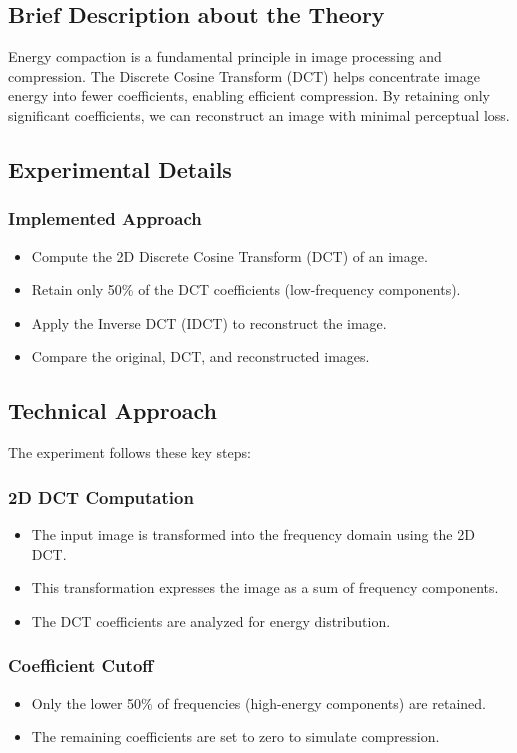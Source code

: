 \documentclass[12pt,a4paper]{article}
\begin{document}
\subsection{Brief Description about the Theory}
Energy compaction is a fundamental principle in image processing and compression. The Discrete Cosine Transform (DCT) helps concentrate image energy into fewer coefficients, enabling efficient compression. By retaining only significant coefficients, we can reconstruct an image with minimal perceptual loss.

\subsection{Experimental Details}
\subsubsection{Implemented Approach}
\begin{itemize}
  \item Compute the 2D Discrete Cosine Transform (DCT) of an image.
  \item Retain only 50\% of the DCT coefficients (low-frequency components).
  \item Apply the Inverse DCT (IDCT) to reconstruct the image.
  \item Compare the original, DCT, and reconstructed images.
\end{itemize}

\subsection{Technical Approach}
The experiment follows these key steps:

\subsubsection{2D DCT Computation}
\begin{itemize}
  \item The input image is transformed into the frequency domain using the 2D DCT.
  \item This transformation expresses the image as a sum of frequency components.
  \item The DCT coefficients are analyzed for energy distribution.
\end{itemize}

\subsubsection{Coefficient Cutoff}
\begin{itemize}
  \item Only the lower 50\% of frequencies (high-energy components) are retained.
  \item The remaining coefficients are set to zero to simulate compression.
\end{itemize}
\end{document}
